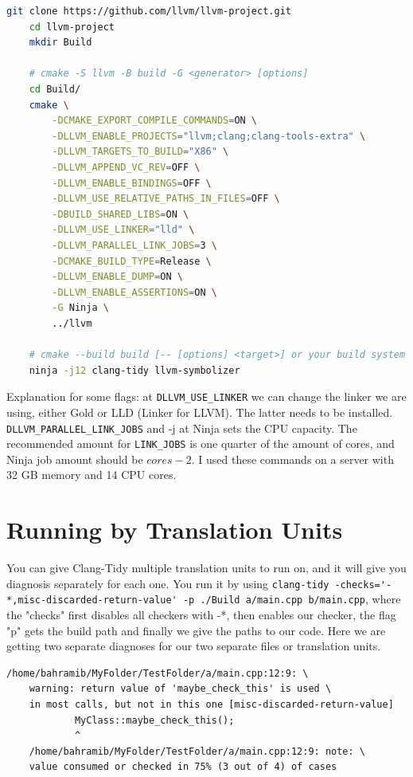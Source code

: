 \begin{lstlisting}[language={bash}]
	git clone https://github.com/llvm/llvm-project.git
	cd llvm-project
	mkdir Build

	# cmake -S llvm -B build -G <generator> [options]
	cd Build/
	cmake \
		-DCMAKE_EXPORT_COMPILE_COMMANDS=ON \
		-DLLVM_ENABLE_PROJECTS="llvm;clang;clang-tools-extra" \
		-DLLVM_TARGETS_TO_BUILD="X86" \
		-DLLVM_APPEND_VC_REV=OFF \
		-DLLVM_ENABLE_BINDINGS=OFF \
		-DLLVM_USE_RELATIVE_PATHS_IN_FILES=OFF \
		-DBUILD_SHARED_LIBS=ON \
		-DLLVM_USE_LINKER="lld" \
		-DLLVM_PARALLEL_LINK_JOBS=3 \
		-DCMAKE_BUILD_TYPE=Release \
		-DLLVM_ENABLE_DUMP=ON \
		-DLLVM_ENABLE_ASSERTIONS=ON \
		-G Ninja \
		../llvm
	
	# cmake --build build [-- [options] <target>] or your build system specified above directly.
	ninja -j12 clang-tidy llvm-symbolizer
\end{lstlisting}

Explanation for some flags: at \texttt{DLLVM\_USE\_LINKER} we can change the linker we are using, either Gold or LLD (Linker for LLVM). The
latter needs to be installed. \texttt{DLLVM\_PARALLEL\_LINK\_JOBS} and -j at Ninja sets the CPU capacity. The recommended amount for
\texttt{LINK\_JOBS} is one quarter of the amount of cores, and Ninja job amount should be $cores - 2$. I used these commands on a
server with 32 GB memory and 14 CPU cores.


\section{Running by Translation Units}
\label{by TU}

You can give Clang-Tidy multiple translation units to run on, and it will give you diagnosis separately for each one. You run it by
using \lstinline{clang-tidy -checks='-*,misc-discarded-return-value' -p ./Build a/main.cpp b/main.cpp},
where the "checks" first disables all checkers with -*, then enables our checker, the flag "p" gets the build path and finally
we give the paths to our code. Here we are getting two separate diagnoses for our two separate files or translation units.

\begin{lstlisting}[caption={Diagnosis output without project level knowledge.},captionpos=b]
	/home/bahramib/MyFolder/TestFolder/a/main.cpp:12:9: \
	warning: return value of 'maybe_check_this' is used \
	in most calls, but not in this one [misc-discarded-return-value]
			MyClass::maybe_check_this();
			^
	/home/bahramib/MyFolder/TestFolder/a/main.cpp:12:9: note: \
	value consumed or checked in 75% (3 out of 4) of cases
\end{lstlisting}



